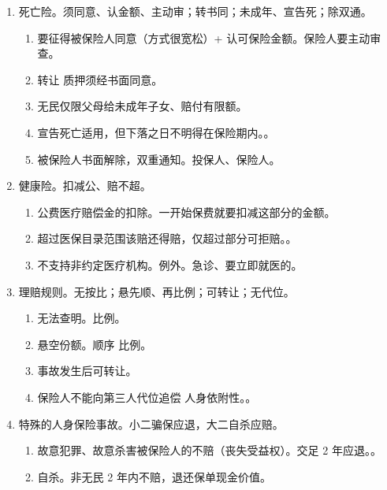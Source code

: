 \begin{enumerate}
\begin{enumerate}
\begin{enumerate}
                \end{enumerate}
        \end{enumerate}
  \item 死亡险。须同意、认金额、主动审；转书同；未成年、宣告死；除双通。
        \begin{enumerate}
          \item 要征得被保险人同意（方式很宽松）+ 认可保险金额。保险人要主动审查。
          \item 转让 \hz 质押须经书面同意。
          \item 无民仅限父母给未成年子女、赔付有限额。
          \item 宣告死亡适用，但下落之日不明得在保险期内。\al{[2000, 2009.9.1 失踪, 2010 | 2014.4 宣告死亡]}。
          \item 被保险人书面解除，双重通知。投保人、保险人。
        \end{enumerate}
  \item 健康险。扣减公、赔不超。
        \begin{enumerate}
          \item 公费医疗赔偿金的扣除。一开始保费就要扣减这部分的金额。
          \item 超过医保目录范围该赔还得赔，仅超过部分可拒赔。。
          \item 不支持非约定医疗机构。例外。急诊、要立即就医的。
        \end{enumerate}
  \item 理赔规则。无按比；悬先顺、再比例；可转让；无代位。
        \begin{enumerate}
          \item 无法查明。比例。
          \item 悬空份额。顺序 \dy 比例。
          \item 事故发生后可转让。
          \item 保险人不能向第三人代位追偿 \yjt 人身依附性。。
        \end{enumerate}
  \item 特殊的人身保险事故。小二骗保应退，大二自杀应赔。
        \begin{enumerate}
          \item 故意犯罪、故意杀害被保险人的不赔（丧失受益权）。交足 2 年应退。。
          \item 自杀。非无民 2 年内不赔，退还保单现金价值。
        \end{enumerate}
\end{enumerate}
